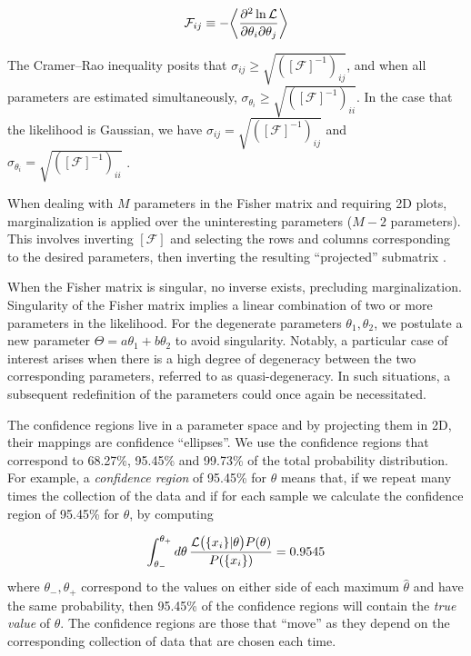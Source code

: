 \documentclass[universe,article,accept,moreauthors,pdftex]{Definitions/mdpi}
\begin{document}
  \begin{equation}
      \mathcal{F}_{ij}\equiv-\bigg{<}\frac{\partial^{2}\ln\mathcal{L}}{\partial\theta_{i}\partial\theta_{j}}\bigg{>}
  \end{equation}
  
The Cramer--Rao inequality posits that $\sigma_{ij}\geq \sqrt{([\mathcal{F}]^{-1})_{ij}} $, and when all parameters are estimated simultaneously, $\sigma_{\theta_{i}}\geq\sqrt{([\mathcal{F}]^{-1})_{ii}} $. In the case that the likelihood is Gaussian, we have $\sigma_{ij}= \sqrt{([\mathcal{F}]^{-1})_{ij}}$ and $\sigma_{\theta_{i}}=\sqrt{([\mathcal{F}]^{-1})_{ii}} $ \cite{article411,Theodoropoulos:2021hkk,Verde_2010}.

When dealing with $M$ parameters in the Fisher matrix and requiring 2D plots, marginalization is applied over the uninteresting parameters ($M-2$ parameters). This involves inverting $[\mathcal{F}]$ and selecting the rows and columns corresponding to the desired parameters, then inverting the resulting ``projected'' submatrix \cite{amendola_tsujikawa_2010,Verde_2010}.

When the Fisher matrix is singular, no inverse exists, precluding marginalization. Singularity of the Fisher matrix implies a linear combination of two or more parameters in the likelihood. For the degenerate parameters $\theta_{1},\theta_{2}$, we postulate a new parameter $\Theta=a\theta_{1}+b\theta_{2}$ to avoid singularity. Notably, a particular case of interest arises when there is a high degree of degeneracy between the two corresponding parameters, referred to as quasi-degeneracy. In such situations, a subsequent redefinition of the parameters could once again be necessitated.

The confidence regions live in a parameter space and by projecting them in 2D, their mappings are confidence ``ellipses''. We use the confidence regions that correspond to 68.27\%, 95.45\% and 99.73\% of the total probability distribution. For example, a \textit{confidence region} of 95.45\% for $\theta$ means that, if we repeat  many times the collection of the data and if for each sample we calculate the confidence region of 95.45\% for $\theta$, by computing 

  \begin{equation}
      \int^{\theta_{+}}_{\theta_{-}}d\theta \,\frac{\mathcal{L}\big{(} \{x_{i}\}|\theta\big{)} P(\theta)}{P(\{x_{i}\})}=0.9545
  \end{equation}
  where $\theta_{-},\theta_{+}$ correspond to the values on either side of each maximum $\hat{\theta}$ and have the same probability, then 95.45\% of the confidence regions will contain the \textit{true value} of $\theta$. The confidence regions are those that ``move'' as they depend on the corresponding collection of data that are chosen each time. 
  
\end{document}
